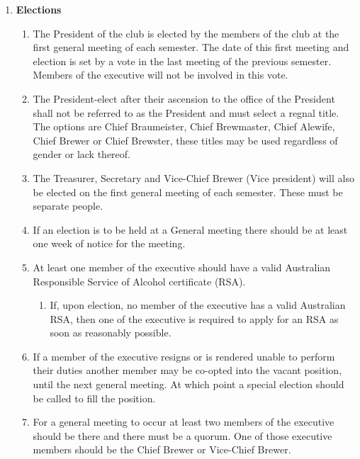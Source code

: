 \documentclass{article}
\begin{document}
\begin{enumerate}[label=\textbf{\arabic*}]
    \item \textbf{Elections}
    \begin{enumerate}[label=4.\arabic*]
        \item The President of the club is elected by the members of the club at the first general meeting of each semester. The date of this first meeting and election is set by a vote in the last meeting of the previous semester. Members of the executive will not be involved in this vote.
        \item The President-elect after their ascension to the office of the President shall not be referred to as the President and must select a regnal title. The options are Chief Braumeister, Chief Brewmaster, Chief Alewife, Chief Brewer or Chief Brewster, these titles may be used regardless of gender or lack thereof.
        \item The Treasurer, Secretary and Vice-Chief Brewer (Vice president) will also be elected on the first general meeting of each semester. These must be separate people.
        \item If an election is to be held at a General meeting there should be at least one week of notice for the meeting.
        \item At least one member of the executive should have a valid Australian Responsible Service of Alcohol certificate (RSA).
        \begin{enumerate}[label=4.6.\arabic*]
            \item If, upon election, no member of the executive has a valid Australian RSA, then one of the executive is required to apply for an RSA as soon as reasonably possible.
        \end{enumerate}
        \item If a member of the executive resigns or is rendered unable to perform their duties another member may be co-opted into the vacant position, until the next general meeting. At which point a special election should be called to fill the position.
        \item For a general meeting to occur at least two members of the executive should be there and there must be a quorum. One of those executive members should be the Chief Brewer or Vice-Chief Brewer.
        \begin{enumerate}[label=4.8.\arabic*]

\end{enumerate}
\end{enumerate}
\end{enumerate}
\end{document}
